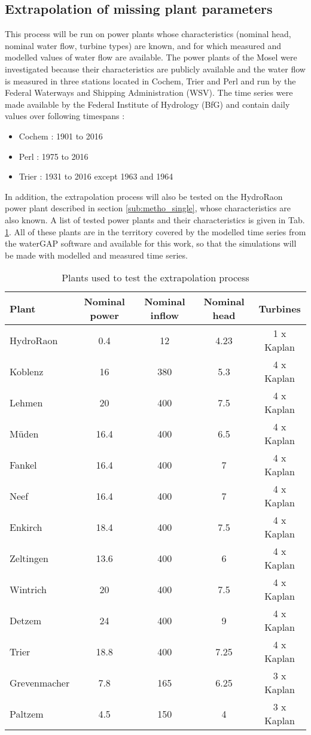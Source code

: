 \subsection{Extrapolation of missing plant parameters}
\label{sub:metho_extra}
This process will be run on power plants whose characteristics (nominal head, nominal water flow, turbine types) are known, and for which measured and modelled values of water flow are available. \newline
The power plants of the Mosel were investigated because their characteristics are publicly available \cite{mosel} and the water flow is measured in three stations located in Cochem, Trier and Perl and run by the Federal Waterways and Shipping Administration (WSV). The time series were made available by the Federal Institute of Hydrology (BfG) and contain daily values over following timespans :
\begin{itemize}
\itemsep0em
 \item Cochem \tabto{2cm}: 1901 to 2016
 \item Perl \tabto{2cm}: 1975 to 2016
 \item Trier \tabto{2cm}: 1931 to 2016 except 1963 and 1964
\end{itemize}
In addition, the extrapolation process will also be tested on the HydroRaon power plant described in section \ref{sub:metho_single}, whose characteristics are also known. A list of tested power plants and their characteristics is given in Tab. \ref{plants_to_test}. All of these plants are in the territory covered by the modelled time series from the waterGAP software and available for this work, so that the simulations will be made with modelled and measured time series.
\begin{table}[H]
 \caption{Plants used to test the extrapolation process}
 \footnotesize
 \label{plants_to_test}
 \centering
 \begin{tabular}{|l|c|c|c|c|}
 \hline
 Plant&Nominal power&Nominal inflow&Nominal head&Turbines\\
 \hline
 HydroRaon&0.4&12&4.23&1 x Kaplan\\
 Koblenz&16&380&5.3&4 x Kaplan\\
 Lehmen&20&400&7.5&4 x Kaplan\\
 Müden&16.4&400&6.5&4 x Kaplan\\
 Fankel&16.4&400&7&4 x Kaplan\\
 Neef&16.4&400&7&4 x Kaplan\\
 Enkirch&18.4&400&7.5&4 x Kaplan\\
 Zeltingen&13.6&400&6&4 x Kaplan\\
 Wintrich&20&400&7.5&4 x Kaplan\\
 Detzem&24&400&9&4 x Kaplan\\
 Trier&18.8&400&7.25&4 x Kaplan\\
 Grevenmacher&7.8&165&6.25&3 x Kaplan\\
 Paltzem&4.5&150&4&3 x Kaplan\\
 \hline
 \end{tabular}
\end{table}

